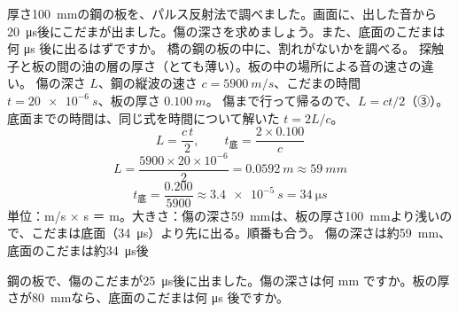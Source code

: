 \begin{phreidai}[鋼の板の中の傷の深さ]
\label{ph:波-10:ex4}厚さ\qty{100}{mm}の鋼の板を、パルス反射法で調べました。画面に、出した音から\qty{20}{\micro s}後にこだまが出ました。傷の深さを求めましょう。また、底面のこだまは何 \si{\micro s} 後に出るはずですか。
\phbamen
橋の鋼の板の中に、割れがないかを調べる。
\phmushi
探触子と板の間の油の層の厚さ（とても薄い）。板の中の場所による音の速さの違い。
\phzu
傷の深さ $L$、鋼の縦波の速さ $c=\qty{5900}{m/s}$、こだまの時間 $t=\qty{20e-6}{s}$、板の厚さ $\qty{0.100}{m}$。
\phriyu
傷まで行って帰るので、$L=ct/2$（③）。底面までの時間は、同じ式を時間について解いた $t=2L/c$。
\phtateru
\[ L=\frac{c\,t}{2},\qquad t_{\text{底}}=\frac{2\times0.100}{c} \]
\phtoku
\[ L=\frac{5900\times20\times10^{-6}}{2}=\qty{0.0592}{m}\approx\qty{59}{mm} \]
\[ t_{\text{底}}=\frac{0.200}{5900}\approx\qty{3.4e-5}{s}=\qty{34}{\micro s} \]
\phtashikame
単位：m/s × s ＝ m。大きさ：傷の深さ\qty{59}{mm}は、板の厚さ\qty{100}{mm}より浅いので、こだまは底面（\qty{34}{\micro s}）より先に出る。順番も合う。
\kotae 傷の深さは約\qty{59}{mm}、底面のこだまは約\qty{34}{\micro s}後
\end{phreidai}
\begin{jibun}
鋼の板で、傷のこだまが\qty{25}{\micro s}後に出ました。傷の深さは何 mm ですか。板の厚さが\qty{80}{mm}なら、底面のこだまは何 \si{\micro s} 後ですか。
\end{jibun}

